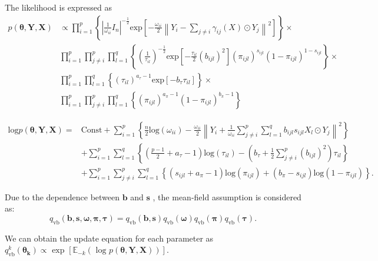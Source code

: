 \documentclass[
]{book}
\begin{document}
The likelihood is expressed as
\begin{align}
    p(\boldsymbol{\theta,Y,X}) &\propto \prod_{i=1}^p 
    \left\{
    \left|
    \frac{1}{\omega_{ii}}I_n
    \right|^{-\frac{1}{2}} \text{exp} 
    \left[ -\frac{\omega_{ii}}{2} 
    \left\| Y_i - \sum_{j \neq i} \gamma_{ij}(X) \odot Y_j 
    \right \|^2 
    \right]
    \right\} \times \nonumber \\ 
    & \prod_{i=1}^p \prod_{j \neq i}^p \prod_{l=1}^q \left\{\left(\frac{1}{\tau_{il}}\right)^{-\frac{1}{2}} 
    \text{exp} \left[-\frac{\tau_{il}}{2}(b_{ijl})^2 \right] \left(\pi_{ijl}\right)^{s_{ijl}}
    \left(1-\pi_{ijl}\right)^{1-s_{ijl}}
    \right\} \times
    \nonumber \\
    &\prod_{i=1}^p \prod_{l=1}^q
    \left\{
    \left(\tau_{il}
    \right) ^ {a_\tau-1} 
    \text{exp}\left[
    -b_\tau \tau_{il}
    \right]
    \right\} \times
    \nonumber \\
    &\prod_{i=1}^p \prod_{j \neq i}^p \prod_{l=1}^q\left\{
    \left(\pi_{ijl}\right)^{a_\pi-1}
    \left(1-\pi_{ijl}\right)^{b_\pi-1}
    \right\} 
\end{align}

\begin{align}
    \text{log} p(\boldsymbol{\theta,Y,X}) = &\text{Const}+ 
    \sum_{i=1}^p \left\{ \frac{n}{2} \text{log}(\omega_{ii}) - \frac{\omega_{ii}}{2} \left\| Y_i + \frac{1}{\omega_{ii}} \sum_{j \neq i}^p \sum_{l=1}^q b_{ijl} s_{ijl} X_l \odot Y_j \right \|^2
    \right\} \nonumber \\
    &+ \sum_{i=1}^p \sum_{l=1}^q 
    \left\{
    \left(
    \frac{p-1}{2} + a_\tau-1
    \right) \text{log}(\tau_{il}) - 
    \left(
    b_\tau + \frac{1}{2}\sum_{j \neq i}^p
    \left(
    b_{ijl}
    \right)^2
    \right) \tau_{il}
    \right\} \nonumber \\
    &+ \sum_{i=1}^p \sum_{j \neq i}^p \sum_{l=1}^q 
    \left\{
    \left(
    s_{ijl} + a_\pi -1
    \right)\text{log}(\pi_{ijl}) + 
    \left(
    b_\pi-s_{ijl}
    \right)
    \text{log}(1-\pi_{ijl})
    \right\}. 
\end{align}

Due to the dependence between \(\boldsymbol{b}\) and \(\boldsymbol{s}\) \citep{titsias2011spike}, the mean-field assumption is considered as:
\[q_{\text{vb}}(\boldsymbol{b,s,\omega,\pi,\tau}) = q_{\text{vb}}(\boldsymbol{b,s})q_{\text{vb}}(\boldsymbol{\omega})q_{\text{vb}}(\boldsymbol{\pi})q_{\text{vb}}(\boldsymbol{\tau}).\]

We can obtain the update equation for each parameter as \(q^{k}_{\text{vb}}(\boldsymbol{\theta_k}) \propto \text{ exp } \left[ \mathbb{E}_{-k} (\text{ log }p(\boldsymbol{\theta,Y,X})) \right]\).
\end{document}
